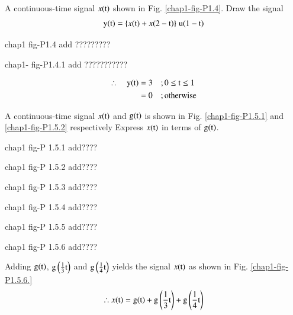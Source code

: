 \begin{example}\label{chap1-example-1.4}
A continuous-time signal $x(\textrm{t})$ shown in Fig. \ref{chap1-fig-P1.4}. Draw the signal
$$
\textrm{y}(\textrm{t}) = \{x{(\textrm{t})} + x{(2-\textrm{t})}\}\; \textrm{u}(1-\textrm{t})
$$
\end{example}

\begin{center}
chap1 fig-P1.4 add ????????? 
\end{center}


\begin{solution}
\begin{center}
chap1- fig-P1.4.1 add ???????????
\end{center}

\begin{align*}
\therefore \quad \textrm{y}(\textrm{t}) &=3 \quad; 0 \leq \textrm{t} \leq 1\\
                            &=0  \quad; \text{otherwise}
\end{align*}
\end{solution}

\begin{example}
A continuous-time signal $x(\textrm{t})$ and $\textrm{g}(\textrm{t})$ is shown in Fig. \ref{chap1-fig-P1.5.1} and \ref{chap1-fig-P1.5.2} respectively Express $x(\textrm{t})$ in terms of $\textrm{g}(\textrm{t})$.
\begin{center}
chap1 fig-P 1.5.1 add????
\end{center}
\begin{center}
chap1 fig-P 1.5.2 add????
\end{center}
\end{example}

\begin{solution}
\begin{center}
chap1 fig-P 1.5.3 add????
\end{center}

\begin{center}
chap1 fig-P 1.5.4 add????
\end{center}

\begin{center}
chap1 fig-P 1.5.5 add????
\end{center}

\begin{center}
chap1 fig-P 1.5.6 add????
\end{center}

Adding $\textrm{g}(\textrm{t})$, $\textrm{g} \left( \frac{1}{3} \textrm{t}\right)$ and $\textrm{g}\left(\frac{1}{4} \textrm{t}\right)$ yields the signal $x(\textrm{t})$ as shown in Fig. \ref{chap1-fig-P1.5.6.}
$$
\therefore x(\textrm{t}) = \textrm{g}(\textrm{t}) + \textrm{g} \left(\frac{1}{3} \textrm{t} \right) + \textrm{g} \left(\frac{1}{4} \textrm{t} \right)
$$
\end{solution}

